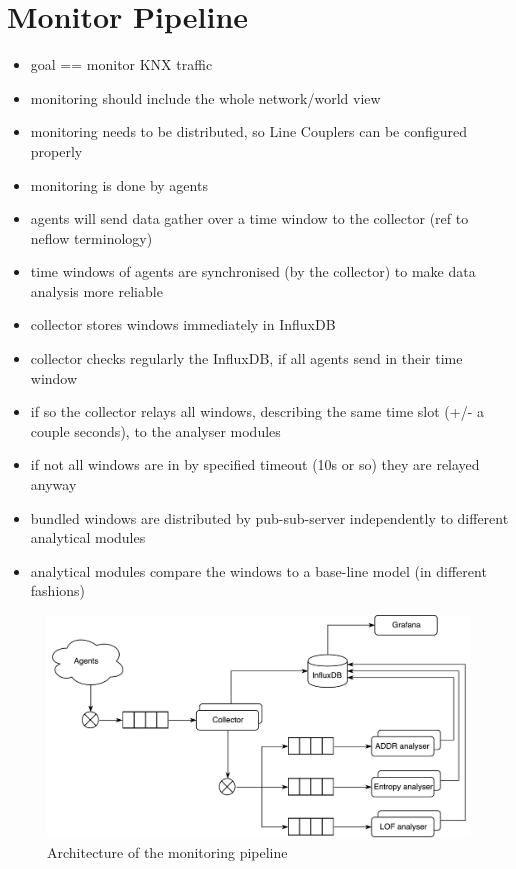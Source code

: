 
\section{Monitor Pipeline}
\label{sec:concept:pipeline}

\begin{itemize}
	\item goal == monitor KNX traffic
	\item monitoring should include the whole network/world view
	\item monitoring needs to be distributed, so Line Couplers can be configured properly
	\item monitoring is done by agents
	\item agents will send data gather over a time window to the collector (ref to neflow terminology)
	\item time windows of agents are synchronised (by the collector) to make data analysis more reliable
	\item collector stores windows immediately in InfluxDB
	\item collector checks regularly the InfluxDB, if all agents send in their time window
	\item if so the collector relays all windows, describing the same time slot (+/- a couple seconds), to the analyser modules
	\item if not all windows are in by specified timeout (10s or so) they are relayed anyway
	\item bundled windows are distributed by pub-sub-server independently to different analytical modules
	\item analytical modules compare the windows to a base-line model (in different fashions)
\end{itemize}

\begin{figure}[h]
	\centering
	\includegraphics[width=\textwidth]{figures/300-concept-architecture.pdf}
	\caption[Pipeline Architecture]{Architecture of the monitoring pipeline}
	\label{fig:concept:architecture}
\end{figure}

